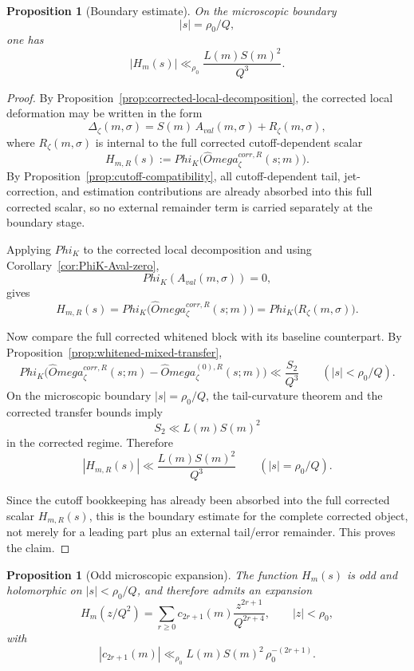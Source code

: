 \documentclass[11pt,a4paper]{amsart}
\def\Omega{Omega}%
\def\Phi{Phi}%
\def\corr{corr}%
\def\val{val}%
\theoremstyle{plain}
\newtheorem{proposition}[theorem]{Proposition}
\theoremstyle{definition}
\newcommand{\val}{\mathrm{val}}
\newcommand{\corr}{\mathrm{corr}}
\begin{document}
\begin{proposition}[Boundary estimate]
\label{prop:boundary-estimate}
On the microscopic boundary
\[
|s|=\rho_0/Q,
\]
one has
\[
|H_m(s)|\ll_{\rho_0}\frac{L(m)S(m)^2}{Q^3}.
\]
\end{proposition}

\begin{proof}
By Proposition~\ref{prop:corrected-local-decomposition}, the corrected local
deformation may be written in the form
\[
\Delta_\zeta(m,\sigma)
=
S(m)\,A_{\val}(m,\sigma)+R_\zeta(m,\sigma),
\]
where $R_\zeta(m,\sigma)$ is internal to the full corrected cutoff-dependent
scalar
\[
H_{m,R}(s):=\Phi_K\!\bigl(\widehat\Omega_\zeta^{\corr,R}(s;m)\bigr).
\]
By Proposition~\ref{prop:cutoff-compatibility}, all cutoff-dependent tail,
jet-correction, and estimation contributions are already absorbed into this
full corrected scalar, so no external remainder term is carried separately at
the boundary stage.

Applying $\Phi_K$ to the corrected local decomposition and using
Corollary~\ref{cor:PhiK-Aval-zero},
\[
\Phi_K(A_{\val}(m,\sigma))=0,
\]
gives
\[
H_{m,R}(s)
=
\Phi_K\!\bigl(\widehat\Omega_\zeta^{\corr,R}(s;m)\bigr)
=
\Phi_K\!\bigl(R_\zeta(m,\sigma)\bigr).
\]

Now compare the full corrected whitened block with its baseline counterpart.
By Proposition~\ref{prop:whitened-mixed-transfer},
\[
\Phi_K\!\bigl(\widehat\Omega_\zeta^{\corr,R}(s;m)-\widehat\Omega_\zeta^{(0),R}(s;m)\bigr)
\ll
\frac{S_2}{Q^3}
\qquad (|s|<\rho_0/Q).
\]
On the microscopic boundary $|s|=\rho_0/Q$, the tail-curvature theorem and
the corrected transfer bounds imply
\[
S_2\ll L(m)S(m)^2
\]
in the corrected regime. Therefore
\[
|H_{m,R}(s)|
\ll
\frac{L(m)S(m)^2}{Q^3}
\qquad (|s|=\rho_0/Q).
\]

Since the cutoff bookkeeping has already been absorbed into the full corrected
scalar $H_{m,R}(s)$, this is the boundary estimate for the complete corrected
object, not merely for a leading part plus an external tail/error remainder.
This proves the claim.
\end{proof}

\begin{proposition}[Odd microscopic expansion]
\label{prop:odd-expansion}
The function $H_m(s)$ is odd and holomorphic on $|s|<\rho_0/Q$, and therefore
admits an expansion
\[
H_m(z/Q^2)
=
\sum_{r\ge 0} c_{2r+1}(m)\frac{z^{2r+1}}{Q^{2r+4}},
\qquad |z|<\rho_0,
\]
with
\[
|c_{2r+1}(m)|\ll_{\rho_0}L(m)S(m)^2\,\rho_0^{-(2r+1)}.
\]
\end{proposition}
\end{document}
